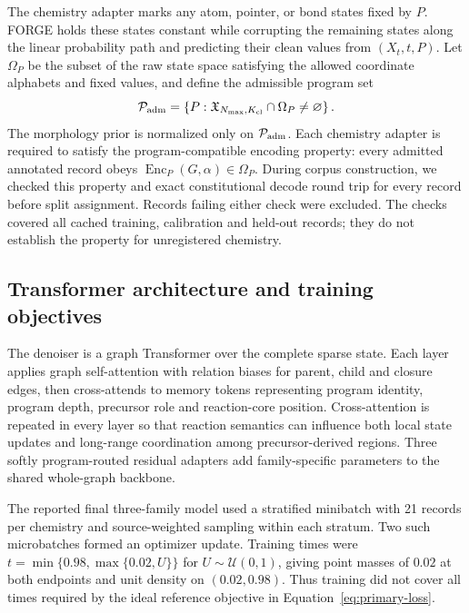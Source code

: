 \documentclass{article}
\theoremstyle{definition}
\begin{document}
The chemistry adapter marks any atom, pointer, or bond states fixed by $P$.
FORGE holds these states constant while corrupting the remaining states along the linear probability
path and predicting their clean values from $(X_t,t,P)$. Let $\Omega_P$ be the subset of the raw state
space satisfying the allowed coordinate alphabets and fixed values, and define the admissible program set
\begin{equation}
    \mathcal P_{\rm adm}
    =\left\{P:\mathfrak X_{N_{\max},K_{\rm cl}}\cap\Omega_P\neq\varnothing\right\}.
\end{equation}
The morphology prior is normalized only on $\mathcal P_{\rm adm}$. Each chemistry adapter is required
to satisfy the program-compatible encoding property: every admitted annotated record obeys
$\operatorname{Enc}_P(G,\alpha)\in\Omega_P$. During corpus construction, we checked this property and exact constitutional decode round trip
for every record before split assignment. Records failing either check were excluded. The checks
covered all cached training, calibration and held-out records; they do not establish the property
for unregistered chemistry.

\subsection{Transformer architecture and training objectives}
\label{app:training}

The denoiser is a graph Transformer over the complete sparse state. Each layer applies graph
self-attention with relation biases for parent, child and closure edges, then cross-attends to memory
tokens representing program identity, program depth, precursor role and reaction-core position.
Cross-attention is repeated in every layer so that reaction semantics can influence both local state
updates and long-range coordination among precursor-derived regions. Three softly program-routed
residual adapters add family-specific parameters to the shared whole-graph backbone.

The reported final three-family model used a stratified minibatch with 21 records per chemistry
and source-weighted sampling within each stratum. Two such microbatches formed an optimizer update.
Training times were $t=\min\{0.98,\max\{0.02,U\}\}$ for $U\sim\mathcal U(0,1)$, giving point
masses of $0.02$ at both endpoints and unit density on $(0.02,0.98)$. Thus training did not cover
all times required by the ideal reference objective in Equation~\ref{eq:primary-loss}.
\end{document}
